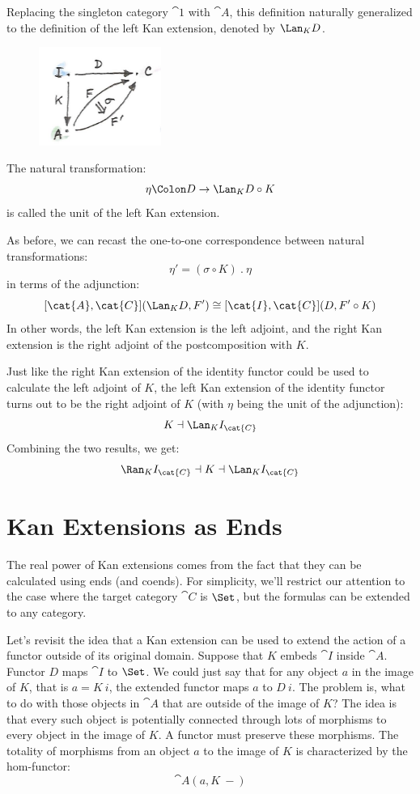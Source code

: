 \noindent
Replacing the singleton category $\cat{1}$ with $\cat{A}$, this
definition naturally generalized to the definition of the left Kan
extension, denoted by $\Lan_{K}D$.

\begin{figure}[H]
\centering
\includegraphics[width=40mm]{images/kan12.jpg}
\end{figure}

\noindent
The natural transformation:
\[\eta \Colon D \to \Lan_{K}D \circ K\]
is called the unit of the left Kan extension.

As before, we can recast the one-to-one correspondence between natural
transformations:
\[\eta' = (\sigma \circ K)\ .\ \eta\]
in terms of the adjunction:
\[[\cat{A}, \cat{C}](\Lan_{K}D, F') \cong [\cat{I}, \cat{C}](D, F' \circ K)\]
In other words, the left Kan extension is the left adjoint, and the
right Kan extension is the right adjoint of the postcomposition with
$K$.

Just like the right Kan extension of the identity functor could be used
to calculate the left adjoint of $K$, the left Kan extension of
the identity functor turns out to be the right adjoint of $K$
(with $\eta$ being the unit of the adjunction):
\[K \dashv \Lan_{K}I_{\cat{C}}\]
Combining the two results, we get:
\[\Ran_{K}I_{\cat{C}} \dashv K \dashv \Lan_{K}I_{\cat{C}}\]

\section{Kan Extensions as Ends}

The real power of Kan extensions comes from the fact that they can be
calculated using ends (and coends). For simplicity, we'll restrict our
attention to the case where the target category $\cat{C}$ is
$\Set$, but the formulas can be extended to any category.

Let's revisit the idea that a Kan extension can be used to extend the
action of a functor outside of its original domain. Suppose that
$K$ embeds $\cat{I}$ inside $\cat{A}$. Functor $D$ maps
$\cat{I}$ to $\Set$. We could just say that for any object
$a$ in the image of $K$, that is $a = K\ i$, the
extended functor maps $a$ to $D\ i$. The problem is, what
to do with those objects in $\cat{A}$ that are outside of the image of
$K$? The idea is that every such object is potentially connected
through lots of morphisms to every object in the image of $K$. A
functor must preserve these morphisms. The totality of morphisms from an
object $a$ to the image of $K$ is characterized by the
hom-functor:
\[\cat{A}(a, K\ -)\]

